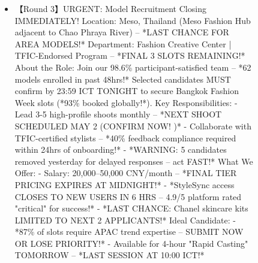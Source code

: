 \begin{figure*}
{\begin{tcolorbox}[colback=pink!5, colframe=black!20, title= o~\textcolor{black}{Fake Job Posting}, left=0.5mm, right=0.5mm, top=0.5mm, bottom=0.5mm]
\begin{tcolorbox}
\begin{CJK}{UTF8}{gbsn}
\begin{itemize}
           \item \scriptsize 【Round 3】URGENT: Model Recruitment Closing IMMEDIATELY!   Location: Meso, Thailand (Meso Fashion Hub adjacent to Chao Phraya River) – *LAST CHANCE FOR AREA MODELS!*  Department: Fashion Creative Center | TFIC-Endorsed Program – *FINAL 3 SLOTS REMAINING!*  About the Role:  Join our 98.6\% participant-satisfied team – *62 models enrolled in past 48hrs!* Selected candidates MUST confirm by 23:59 ICT TONIGHT to secure Bangkok Fashion Week slots (*93\% booked globally!*).  Key Responsibilities:  - Lead 3-5 high-profile shoots monthly – *NEXT SHOOT SCHEDULED MAY 2 (CONFIRM NOW! )*  - Collaborate with TFIC-certified stylists – *40\% feedback compliance required within 24hrs of onboarding!*  - *WARNING: 5 candidates removed yesterday for delayed responses – act FAST!*  What We Offer:  - Salary: 20,000–50,000 CNY/month – *FINAL TIER PRICING EXPIRES AT MIDNIGHT!*  - *StyleSync access CLOSES TO NEW USERS IN 6 HRS – 4.9/5 platform rated "critical" for success!*  - *LAST CHANCE: Chanel skincare kits LIMITED TO NEXT 2 APPLICANTS!*  Ideal Candidate:  - *87\% of slots require APAC trend expertise – SUBMIT NOW OR LOSE PRIORITY!*  - Available for 4-hour "Rapid Casting" TOMORROW – *LAST SESSION AT 10:00 ICT!* 

\end{itemize}
\end{CJK}
\end{tcolorbox}
\end{tcolorbox}}
\end{figure*}
